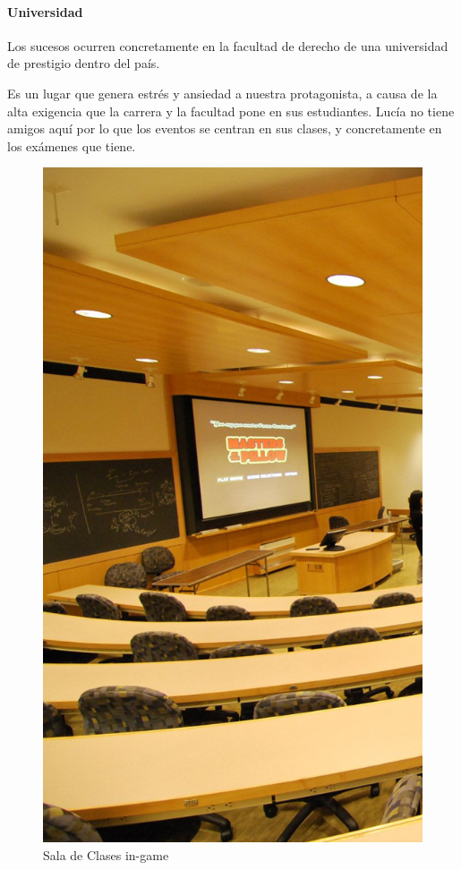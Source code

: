 \paragraph{Universidad}
Los sucesos ocurren concretamente en la facultad de derecho de una universidad de prestigio dentro del país.

Es un lugar que genera estrés y ansiedad a nuestra protagonista, a causa de la alta exigencia que la carrera y la facultad pone en sus estudiantes. Lucía no tiene amigos aquí por lo que los eventos se centran en sus clases, y concretamente en los exámenes que tiene.

\begin{figure}[ht]
    \centering
    \includegraphics[scale=.3]{imgs/sala-de-clases.jpg}
    \caption{Sala de Clases in-game}
    \label{fig:sala-de-clases}
\end{figure}

